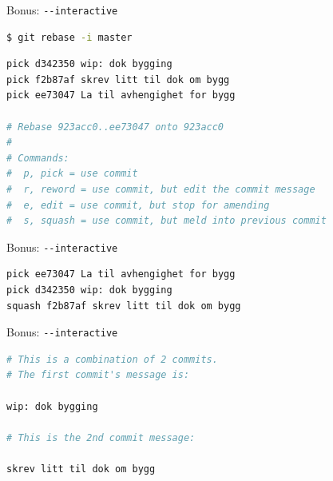 \documentclass{beamer}
\begin{document}
\begin{frame}[fragile]{Bonus: \texttt{-{}-interactive}}
    \begin{lstlisting}[language=bash]
      $ git rebase -i master
    \end{lstlisting}
    \begin{lstlisting}[language=bash]
pick d342350 wip: dok bygging                             
pick f2b87af skrev litt til dok om bygg                   
pick ee73047 La til avhengighet for bygg                  
                                                          
# Rebase 923acc0..ee73047 onto 923acc0                    
#                                                         
# Commands:                                               
#  p, pick = use commit                                   
#  r, reword = use commit, but edit the commit message    
#  e, edit = use commit, but stop for amending            
#  s, squash = use commit, but meld into previous commit
    \end{lstlisting}
\end{frame}

\begin{frame}[fragile]{Bonus: \texttt{-{}-interactive}}
    \begin{lstlisting}[language=bash]
pick ee73047 La til avhengighet for bygg                  
pick d342350 wip: dok bygging                             
squash f2b87af skrev litt til dok om bygg                   
    \end{lstlisting}
\end{frame}

\begin{frame}[fragile]{Bonus: \texttt{-{}-interactive}}
    \begin{lstlisting}[language=bash]
# This is a combination of 2 commits.                     
# The first commit's message is:                          
                                                          
wip: dok bygging                                          
                                                          
# This is the 2nd commit message:                         
                                                          
skrev litt til dok om bygg 
    \end{lstlisting}
\end{frame}
\end{document}
